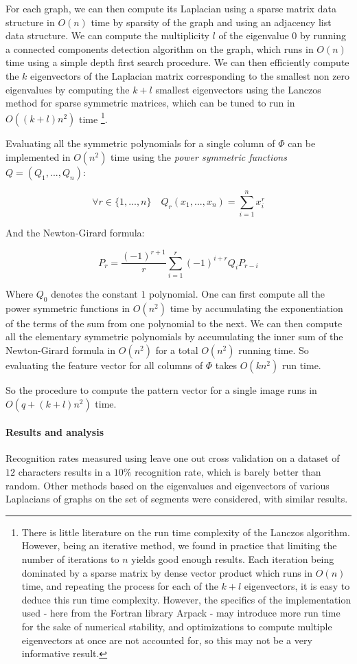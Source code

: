 For each graph, we can then compute its Laplacian using a sparse matrix data structure in $O(n)$ time by sparsity of the graph and using an adjacency list data structure. We can compute the multiplicity $l$ of the eigenvalue $0$ by running a connected components detection algorithm on the graph, which runs in $O(n)$ time using a simple depth first search procedure. We can then efficiently compute the $k$ eigenvectors of the Laplacian matrix corresponding to the smallest non zero eigenvalues by computing the $k + l$ smallest eigenvectors using the Lanczos method for sparse symmetric matrices, which can be tuned to run in $O((k + l)n^2)$ time \footnote{
There is little literature on the run time complexity of the Lanczos algorithm. However, being an iterative method, we found in practice that limiting the number of iterations to $n$ yields good enough results. Each iteration being dominated by a sparse matrix by dense vector product which runs in $O(n)$ time, and repeating the process for each of the $k + l$ eigenvectors, it is easy to deduce this run time complexity. However, the specifics of the implementation used - here from the Fortran library Arpack - may introduce more run time for the sake of numerical stability, and optimizations to compute multiple eigenvectors at once are not accounted for, so this may not be a very informative result.
}.

Evaluating all the symmetric polynomials for a single column of $\Phi$ can be implemented in $O(n^2)$ time using the \emph{power symmetric functions} $Q = (Q_1, ..., Q_n)$:

\[
\forall r \in \{1, ..., n\} \quad Q_r(x_1, ..., x_n) = \sum_{i = 1}^n x_i^r
\]

And the Newton-Girard formula:

\[
P_r = \frac{(-1)^{r+1}}{r} \sum_{i = 1}^r (-1)^{i + r}Q_iP_{r - i}
\]


Where $Q_0$ denotes the constant $1$ polynomial. One can first compute all the power symmetric functions in $O(n^2)$ time by accumulating the exponentiation of the terms of the sum from one polynomial to the next. We can then compute all the elementary symmetric polynomials by accumulating the inner sum of the Newton-Girard formula in $O(n^2)$ for a total $O(n^2)$ running time. So evaluating the feature vector for all columns of $\Phi$ takes $O(kn^2)$ run time.

So the procedure to compute the pattern vector for a single image runs in $O(q + (k + l)n^2)$ time.

\paragraph{Results and analysis}
Recognition rates measured using leave one out cross validation on a dataset of $12$ characters results in a $10\%$ recognition rate, which is barely better than random. Other methods based on the eigenvalues and eigenvectors of various Laplacians of graphs on the set of segments were considered, with similar results.

